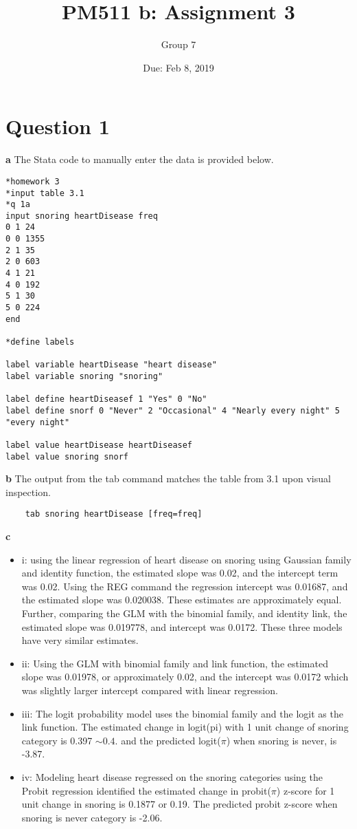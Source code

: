 \documentclass{article}
\title{PM511 b: Assignment 3}
\author{Group 7}
\date{Due: Feb 8, 2019}
\begin{document}
\selectfont

\maketitle

\section*{Question 1}
\textbf{a} The Stata code to manually enter the data is provided below.

\begin{verbatim}
*homework 3
*input table 3.1
*q 1a
input snoring heartDisease freq
0 1 24
0 0 1355
2 1 35
2 0 603
4 1 21
4 0 192
5 1 30
5 0 224
end

*define labels

label variable heartDisease "heart disease"
label variable snoring "snoring"

label define heartDiseasef 1 "Yes" 0 "No"
label define snorf 0 "Never" 2 "Occasional" 4 "Nearly every night" 5 "every night"

label value heartDisease heartDiseasef
label value snoring snorf
\end{verbatim}

\textbf{b}
 The output from the tab command matches the table from 3.1 upon visual inspection.
\begin{verbatim}
    tab snoring heartDisease [freq=freq]
\end{verbatim}

\textbf{c}
\begin{itemize}
    \item i: using the linear regression of heart disease on snoring using Gaussian family and identity function, the estimated slope was 0.02, and the intercept term was 0.02. Using the REG command the regression intercept was 0.01687, and the estimated slope was 0.020038.  These estimates are approximately equal.  Further, comparing the GLM with the binomial family, and identity link, the estimated slope was 0.019778, and intercept was 0.0172.  These three models have very similar estimates.
    \item ii: Using the GLM with binomial family and link function, the estimated slope was 0.01978, or approximately 0.02, and the intercept was 0.0172 which was slightly larger intercept compared with linear regression.
    \item iii: The logit probability model uses the binomial family and the logit as the link function.  The estimated change in logit(pi) with 1 unit change of snoring category is 0.397 $\sim 0.4$. and the predicted logit($\pi$) when snoring is never, is -3.87.
    \item iv: Modeling heart disease regressed on the snoring categories using the Probit regression identified the estimated change in probit($\pi$) z-score for 1 unit change in snoring is 0.1877 or 0.19.  The predicted probit z-score when snoring is never category is -2.06.
\end{itemize}
\end{document}
